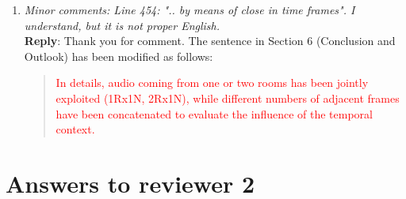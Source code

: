 \documentclass[11pt, technote, letterpaper, oneside, onecolumn]{IEEEtran}
\begin{document}
\begin{enumerate}
\item \textit{Minor comments: Line 454: ".. by means of close in time frames". I understand, but it is not proper English.\\}
\textbf{Reply}: Thank you for comment. The sentence in Section 6 (Conclusion and Outlook) has been modified as follows:
\begin{quote}
	\textcolor{red}{In details, audio coming from one or two rooms has been jointly exploited (1Rx1N, 2Rx1N), while different numbers of adjacent frames have been concatenated to evaluate the influence of the temporal context.}
\end{quote}
\end{enumerate}

\newpage
\section{Answers to reviewer 2}\label{sec:rev2}
\end{document}
